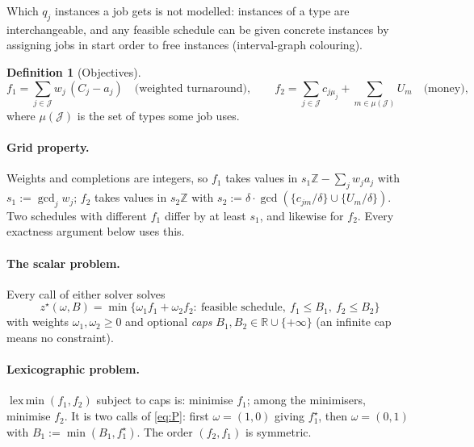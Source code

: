 \documentclass[11pt,a4paper]{article}
\theoremstyle{definition}
\newtheorem{definition}[theorem]{Definition}
\theoremstyle{remark}
\newcommand{\J}{\mathcal{J}}
\newcommand{\Z}{\mathbb{Z}}
\newcommand{\R}{\mathbb{R}}
\begin{document}
Which $q_j$ instances a job gets is not modelled: instances of a type are
interchangeable, and any feasible schedule can be given concrete instances by
assigning jobs in start order to free instances (interval-graph colouring).

\begin{definition}[Objectives]
\[
f_1=\sum_{j\in\J}w_j\,(C_j-a_j)\quad\text{(weighted turnaround)},\qquad
f_2=\sum_{j\in\J}c_{j\mu_j}+\sum_{m\in\mu(\J)}U_m\quad\text{(money)},
\]
where $\mu(\J)$ is the set of types some job uses.
\end{definition}

\paragraph{Grid property.} Weights and completions are integers, so $f_1$
takes values in $s_1\Z-\sum_jw_ja_j$ with $s_1:=\gcd_jw_j$; $f_2$ takes
values in $s_2\Z$ with $s_2:=\delta\cdot\gcd(\{c_{jm}/\delta\}\cup\{U_m/\delta\})$.
Two schedules with different $f_1$ differ by at least $s_1$, and likewise for
$f_2$. Every exactness argument below uses this.

\paragraph{The scalar problem.} Every call of either solver solves
\begin{equation}\label{eq:P}\tag{P}
z^\star(\omega,B)=\min\bigl\{\omega_1f_1+\omega_2f_2:\ \text{feasible schedule},\ f_1\le B_1,\ f_2\le B_2\bigr\}
\end{equation}
with weights $\omega_1,\omega_2\ge0$ and optional \emph{caps}
$B_1,B_2\in\R\cup\{+\infty\}$ (an infinite cap means no constraint).

\paragraph{Lexicographic problem.} $\operatorname{lex\,min}(f_1,f_2)$ subject to
caps is: minimise $f_1$; among the minimisers, minimise $f_2$. It is two calls
of \eqref{eq:P}: first $\omega=(1,0)$ giving $f_1^\star$, then $\omega=(0,1)$
with $B_1:=\min(B_1,f_1^\star)$. The order $(f_2,f_1)$ is symmetric.
\end{document}
